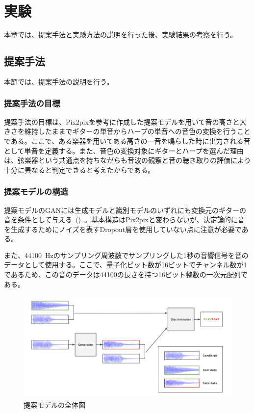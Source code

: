 \chapter{実験}

本章では、提案手法と実験方法の説明を行った後、実験結果の考察を行う。

\section{提案手法}

本節では、提案手法の説明を行う。

\subsection{提案手法の目標}
\label{sec:pr_purpose}

提案手法の目標は、Pix2pixを参考に作成した提案モデルを用いて音の高さと大きさを維持したままでギターの単音からハープの単音への音色の変換を行うことである。ここで、ある楽器を用いてある高さの一音を鳴らした時に出力される音として単音を定義する。また、音色の変換対象にギターとハープを選んだ理由は、弦楽器という共通点を持ちながらも音波の観察と音の聴き取りの評価により十分に異なると判定できると考えたからである。

\subsection{提案モデルの構造}
\label{sec:proposed}

提案モデルのGANには生成モデルと識別モデルのいずれにも変換元のギターの音を条件として与える~()~。基本構造はPix2pixと変わらないが、決定論的に音を生成するためにノイズを表すDropout層を使用していない点に注意が必要である。

また、44100~Hzのサンプリング周波数でサンプリングした1秒の音響信号を音のデータとして使用する。ここで、量子化ビット数が16ビットでチャンネル数が1であるため、この音のデータは44100の長さを持つ16ビット整数の一次元配列である。

\begin{figure}[b]
\centering
\includegraphics[width=0.9\columnwidth]{figure/pr_model.png}
\caption{提案モデルの全体図}
\label{fig:pr_model}
\end{figure}

